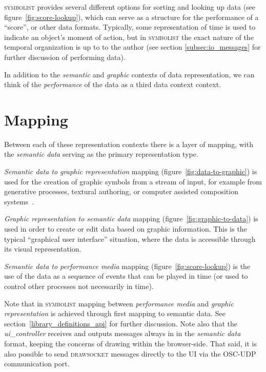 \documentclass{article}
\def\symbolist{\textsc{symbolist}\xspace}
\def\drawsocket{\textsc{drawsocket}\xspace}
\def\uicontroller{\textit{ui\_controller}\xspace}
\begin{document}
\symbolist provides several different options for sorting and looking up data (see figure~\ref{fig:score-lookup}), which can serve as a structure for the performance of a ``score'', or other data formats. Typically, some representation of time is used to indicate an object's moment of action, but in \symbolist the exact nature of the temporal organization is up to to the author (see section \ref{subsec:io_messages} for further discussion of performing data). 

In addition to the \textit{semantic} and \textit{graphic} contexts of data representation, we can think of the \textit{performance} of the data as a third data context context.

\section{Mapping}\label{sec:mapping}

Between each of these representation contexts there is a layer of mapping, with the \textit{semantic data} serving as the primary representation type. 

\textit{Semantic data to graphic representation} mapping (figure~\ref{fig:data-to-graphic}) is used for the creation of graphic symbols from a stream of input, for example from generative processes, textural authoring, or computer assisted composition systems~\cite{bresson2011om, didkovsky2008maxscore, agostini2015max, baca2015abjad, burloiu2017visual}.

\textit{Graphic representation to semantic data} mapping (figure~\ref{fig:graphic-to-data}) is used in order to create or edit data based on graphic information. This is the typical ``graphical user interface'' situation, where the data is accessible through its visual representation.

\textit{Semantic data to performance media} mapping (figure~\ref{fig:score-lookup}) is the use of the data as a sequence of events that can be played in time (or used to control other processes not necessarily in time).

Note that in \symbolist mapping between \textit{performance media} and \textit{graphic representation} is achieved through first mapping to semantic data. See section~\ref{library_definitions_api} for further discussion.
Note also that the \uicontroller receives and outputs messages always in in the \textit{semantic data} format, keeping the concerns of drawing within the browser-side. That said, it is also possible to send \drawsocket messages directly to the UI via the OSC-UDP communication port.
\end{document}

